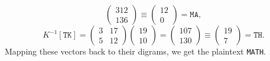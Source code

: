 \documentclass[12pt]{article}
\newenvironment{answer}
    {\begin{adjustwidth}{0pt}{0pt}}
    {\end{adjustwidth}}
\theoremstyle{remark}  %
\begin{document}
\begin{answer}
$$\begin{pmatrix}
            312 \\
            136
        \end{pmatrix} \equiv
        \begin{pmatrix}
            12 \\
            0
        \end{pmatrix} = \texttt{MA}, $$$$ K^{-1}[\texttt{TK}] = 
        \begin{pmatrix}
            3 & 17 \\
            5 & 12
        \end{pmatrix}
        \begin{pmatrix}
            19 \\
            10
        \end{pmatrix} = 
        \begin{pmatrix}
            107 \\
            130
        \end{pmatrix} \equiv
        \begin{pmatrix}
            19 \\
            7
        \end{pmatrix} = \texttt{TH}
        .$$ Mapping these vectors back to their digrams, we get the plaintext \texttt{MATH}.

    \end{answer}
\end{document}
